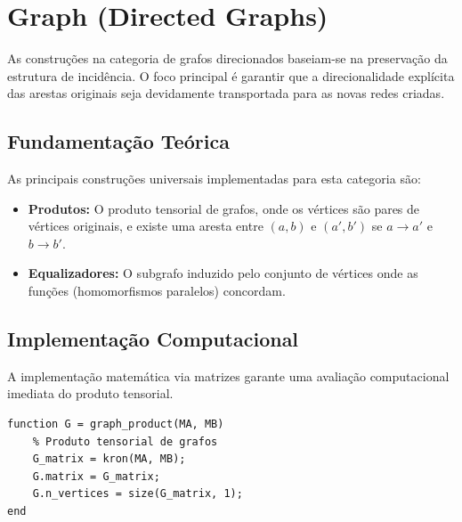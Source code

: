 \section{Graph (Directed Graphs)}
As construções na categoria de grafos direcionados baseiam-se na preservação da estrutura de incidência. O foco principal é garantir que a direcionalidade explícita das arestas originais seja devidamente transportada para as novas redes criadas.

\subsection{Fundamentação Teórica}
As principais construções universais implementadas para esta categoria são:
\begin{itemize}
    \item \textbf{Produtos:} O produto tensorial de grafos, onde os vértices são pares de vértices originais, e existe uma aresta entre $(a,b)$ e $(a',b')$ se $a \to a'$ e $b \to b'$.
    \item \textbf{Equalizadores:} O subgrafo induzido pelo conjunto de vértices onde as funções (homomorfismos paralelos) concordam.
\end{itemize}

\subsection{Implementação Computacional}
A implementação matemática via matrizes garante uma avaliação computacional imediata do produto tensorial.

\begin{lstlisting}[caption={Construção do Produto Tensorial de Grafos}]
function G = graph_product(MA, MB)
    % Produto tensorial de grafos
    G_matrix = kron(MA, MB);
    G.matrix = G_matrix;
    G.n_vertices = size(G_matrix, 1);
end
\end{lstlisting}